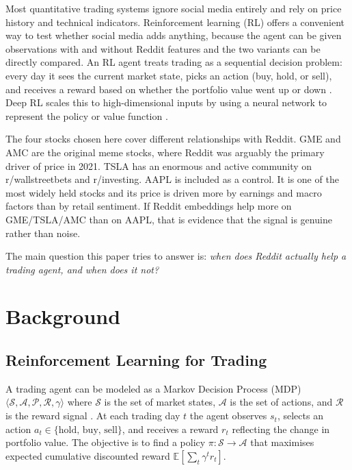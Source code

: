 \documentclass[letterpaper,twocolumn]{article}
\begin{document}
Most quantitative trading systems ignore social media entirely
and rely on price history and technical indicators.
Reinforcement learning (RL) offers a convenient way to test
whether social media adds anything, because the agent can be
given observations with and without Reddit features and the
two variants can be directly compared.
An RL agent treats trading as a sequential decision problem:
every day it sees the current market state, picks an action
(buy, hold, or sell), and receives a reward based on whether
the portfolio value went up or down \citep{moody1998performance}.
Deep RL scales this to high-dimensional inputs by using a
neural network to represent the policy or value function
\citep{mnih2015human,schulman2017proximal}.

The four stocks chosen here cover different relationships with
Reddit.
GME and AMC are the original meme stocks, where Reddit was
arguably the primary driver of price in 2021.
TSLA has an enormous and active community on r/wallstreetbets
and r/investing.
AAPL is included as a control. It is one of the most widely
held stocks and its price is driven more by earnings and
macro factors than by retail sentiment.
If Reddit embeddings help more on GME/TSLA/AMC than on AAPL,
that is evidence that the signal is genuine rather than noise.

The main question this paper tries to answer is: \textit{when
does Reddit actually help a trading agent, and when does it
not?}

\section{Background}

\subsection{Reinforcement Learning for Trading}

A trading agent can be modeled as a Markov Decision Process
(MDP) $\langle \mathcal{S}, \mathcal{A}, \mathcal{P},
\mathcal{R}, \gamma \rangle$ where $\mathcal{S}$ is the set
of market states, $\mathcal{A}$ is the set of actions, and
$\mathcal{R}$ is the reward signal \citep{sutton2018reinforcement}.
At each trading day $t$ the agent observes $s_t$, selects an
action $a_t \in \{\text{hold, buy, sell}\}$, and receives a
reward $r_t$ reflecting the change in portfolio value.
The objective is to find a policy $\pi: \mathcal{S} \to
\mathcal{A}$ that maximises expected cumulative discounted
reward $\mathbb{E}[\sum_{t} \gamma^t r_t]$.
\end{document}
